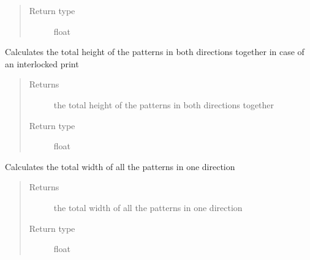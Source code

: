 \documentclass[letterpaper,10pt,english]{sphinxmanual}
\begin{document}
\begin{fulllineitems}
\begin{fulllineitems}
\begin{quote}
\begin{description}
\item[{Return type}] \leavevmode
\sphinxAtStartPar
float

\end{description}\end{quote}

\end{fulllineitems}


\begin{fulllineitems}
\label{\detokenize{index:calibration_pattern.calibration_pattern.total_height_interlocked}}
\sphinxAtStartPar
Calculates the total height of the patterns in both directions together in case of an interlocked print
\begin{quote}\begin{description}
\item[{Returns}] \leavevmode
\sphinxAtStartPar
the total height of the patterns in both directions together

\item[{Return type}] \leavevmode
\sphinxAtStartPar
float

\end{description}\end{quote}

\end{fulllineitems}


\begin{fulllineitems}
\label{\detokenize{index:calibration_pattern.calibration_pattern.total_one_dir_width}}
\sphinxAtStartPar
Calculates the total width of all the patterns in one direction
\begin{quote}\begin{description}
\item[{Returns}] \leavevmode
\sphinxAtStartPar
the total width of all the patterns in one direction

\item[{Return type}] \leavevmode
\sphinxAtStartPar
float


\end{description}
\end{quote}
\end{fulllineitems}
\end{fulllineitems}
\end{document}
